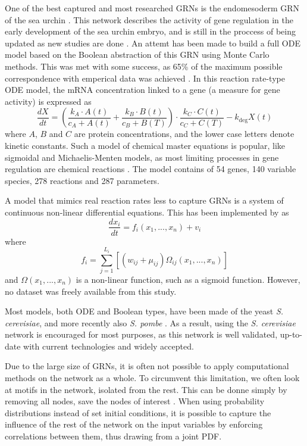 \documentclass[../main.tex]{subfiles}
\begin{document}
One of the best captured and most researched GRNs is the endomesoderm GRN of the sea urchin \cite{bolouri2002modeling, kuhn2009monte}.
This network describes the activity of gene regulation in the early development of the sea urchin embryo, and is still in the proccess of being updated as new studies are done \cite{urchinmodel}.
An attemt has been made to build a full ODE model based on the Boolean abstraction of this GRN using Monte Carlo methods.
This was met with some success, as 65\% of the maximum possible correspondence with emperical data was achieved \cite{kuhn2009monte}.
In this reaction rate-type ODE model, the mRNA concentration linked to a gene (a measure for gene activity) is expressed as
%
\begin{equation}
\frac{dX}{dt} = (\frac{k_A \cdot A(t)}{c_A + A(t)} + \frac{k_B \cdot B(t)}{c_B + B(T)}) \cdot \frac{k_C \cdot C(t)}{c_C + C(T)} - k_\mathrm{deg} X(t)
\end{equation}
%
where $A$, $B$ and $C$ are protein concentrations, and the lower case letters denote kinetic constants.
Such a model of chemical master equations is popular, like sigmoidal and Michaelis-Menten models, as most limiting processes in gene regulation are chemical reactions \cite{aijo2009learning}.
The model contains of 54 genes, 140 variable species, 278 reactions and 287 parameters.

A model that mimics real reaction rates less to capture GRNs is a system of continuous non-linear differential equations.
This has been implemented by \cite{qian2008inference} as
%
\begin{equation}
\frac{dx_i}{dt} = f_i(x_1,...,x_n) + v_i
\end{equation}
%
where
%
\begin{equation}
f_i = \sum_{j=1}^{L_i} [(w_{ij}+ \mu_{ij})\Omega_{ij}(x_1,...,x_n)]
\end{equation}
%
and $\Omega(x_1,...,x_n)$ is a non-linear function, such as a sigmoid function.
However, no dataset was freely available from this study.

Most models, both ODE and Boolean types, have been made of the yeast \textit{S. cerevisiae}, and more recently also \textit{S. pombe} \cite{ferrell2011modeling}. As a result, using the \textit{S. cerevisiae} network is encouraged for most purposes, as this network is well validated, up-to-date with current technologies and widely accepted.

Due to the large size of GRNs, it is often not possible to apply computational methods on the network as a whole.
To circumvent this limitation, we often look at motifs in the network, isolated from the rest.
This can be donne simply by removing all nodes, save the nodes of interest \cite{zhang2012chaotic}.
When using probability distributions instead of set initial conditions, it is possible to capture the influence of the rest of the network on the input variables by enforcing correlations between them, thus drawing from a joint PDF.
\end{document}
